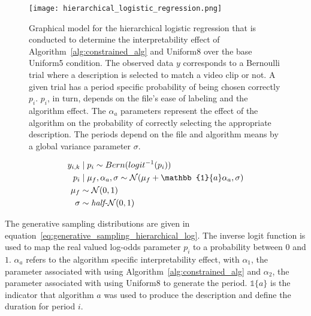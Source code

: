 \begin{figure}
\centering
\texttt{[image: hierarchical\_logistic\_regression.png]}
\caption{Graphical model for the hierarchical logistic regression that is conducted to determine the interpretability effect of Algorithm~\ref{alg:constrained_alg} and Uniform8 over the base Uniform5 condition. The observed data $y$ corresponds to a Bernoulli trial where a description is selected to match a video clip or not. A given trial has a period specific probability of being chosen correctly $p_i$. $p_i$, in turn, depends on the file's ease of labeling and the algorithm effect. The $\alpha_a$ parameters represent the effect of the algorithm on the probability of correctly selecting the appropriate description. The periods depend on the file and algorithm means by a global variance parameter $\sigma$.}
\label{fig:hierarchical_logistic_regression}
\end{figure}

\begin{equation}\label{eq:generative_sampling_hierarchical_log}
  \begin{split}
    y_{i,k} &\mid p_i \sim Bern(logit^{-1}(p_i)) \\
    p_i &\mid \mu_f,\alpha_a,\sigma \sim \mathcal{N}(\mu_f + \mathbb{1}\{a\} \alpha_a, \sigma ) \\
    \mu_f &\sim \mathcal{N}(0,1) \\
    \sigma &\sim \text{\textit{half-}}\mathcal{N}(0,1)
  \end{split}
\end{equation}

The generative sampling distributions are given in equation~\ref{eq:generative_sampling_hierarchical_log}. The inverse logit function is used to map the real valued log-odds parameter $p_i$ to a probability between $0$ and $1$. $\alpha_a$ refers to the algorithm specific interpretability effect, with $\alpha_1$, the parameter associated with using Algorithm~\ref{alg:constrained_alg} and $\alpha_2$, the parameter associated with using Uniform8 to generate the period. $\mathbb{1}\{a\}$ is the indicator that algorithm $a$ was used to produce the description and define the duration for period $i$.

